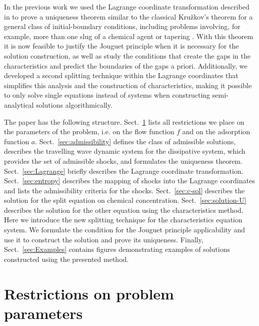\documentclass[12pt]{article}
\theoremstyle{definition}
\begin{document}
In the previous work \cite{MR2024} we used the Lagrange coordinate transformation described in \cite{PiBeSh06} to prove a uniqueness theorem similar to the classical Kru\v{z}kov's theorem \cite{Kruzhkov} for a general class of initial-boundary conditions, including problems involving, for example, more than one slug of a chemical agent or tapering \cite{Tapering}. With this theorem it is now feasible to justify the Jouguet principle when it is necessary for the solution construction, as well as study the conditions that create the gaps in the characteristics and predict the boundaries of the gaps a priori. Additionally, we developed a second splitting technique within the Lagrange coordinates that simplifies this analysis and the construction of characteristics, making it possible to only solve single equations instead of systems when constructing semi-analytical solutions algorithmically.


The paper has the following structure. Sect.~\ref{sec:restrictions} lists all restrictions we place on the parameters of the problem, i.e. on the flow function $f$ and on the adsorption function $a$. Sect.~\ref{sec:admissibility} defines the class of admissible solutions, describes the travelling wave dynamic system for the dissipative system, which provides the set of admissible shocks, and formulates the uniqueness theorem. Sect.~\ref{sec:Lagrange} briefly describes the Lagrange coordinate transformation. Sect.~\ref{sec:entropy} describes the mapping of shocks into the Lagrange coordinates and lists the admissibility criteria for the shocks. Sect.~\ref{sec:c-sol} describes the solution for the split equation on chemical concentration. Sect.~\ref{sec:solution-U} describes the solution for the other equation using the characteristics method. Here we introduce the new splitting technique for the characteristics equation system. We formulate the condition for the Jouguet principle applicability and use it to construct the solution and prove its uniqueness. Finally, Sect.~\ref{sec:Examples} contains figures demonstrating examples of solutions constructed using the presented method.

\section{Restrictions on problem parameters}
\label{sec:restrictions}
\end{document}
